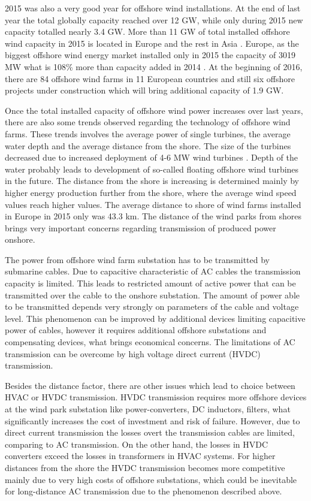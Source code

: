 \documentclass[12pt]{report} %
\begin{document}
2015 was also a very good year for offshore wind installations. At the end of last year the total globally capacity reached over 12 GW, while only during 2015 new capacity totalled nearly 3.4 GW. More than 11 GW of total installed offshore wind capacity in 2015 is located in Europe and the rest in Asia \cite{gwec2015}. Europe, as the biggest offshore wind energy market installed only in 2015 the capacity of 3019 MW what is 108\% more than capacity added in 2014 \cite{ewea2016}. At the beginning of 2016, there are 84 offshore wind farms in 11 European countries and still six offshore projects under construction which will bring additional capacity of 1.9 GW.

Once the total installed capacity of offshore wind power increases over last years, there are also some trends observed regarding the technology of offshore wind farms. These trends involves the average power of single turbines, the average water depth and the average distance from the shore. The size of the turbines decreased due to increased deployment of 4-6 MW wind turbines \cite{ewea2016}. Depth of the water probably leads to development of so-called floating offshore wind turbines in the future. The distance from the shore is increasing is determined mainly by higher energy production further from the shore, where the average wind speed values reach higher values. The average distance to shore of wind farms installed in Europe in 2015 only was 43.3 km. The distance of the wind parks from shores brings very important concerns regarding transmission of produced power onshore.

The power from offshore wind farm substation has to be transmitted by submarine cables. Due to capacitive characteristic of AC cables the transmission capacity is limited. This leads to restricted amount of active power that can be transmitted over the cable to the onshore substation. The amount of power able to be transmitted depends very strongly on parameters of the cable and voltage level. This phenomenon can be improved by additional devices limiting capacitive power of cables, however it requires additional offshore substations and compensating devices, what brings economical concerns. The limitations of AC transmission can be overcome by high voltage direct current (HVDC) transmission.

Besides the distance factor, there are other issues which lead to choice between HVAC or HVDC transmission. HVDC transmission requires more offshore devices at the wind park substation like power-converters, DC inductors, filters, what significantly increases the cost of investment and risk of failure. However, due to direct current transmission the losses overt the transmission cables are limited, comparing to AC transmission. On the other hand, the losses in HVDC converters exceed the losses in transformers in HVAC systems. For higher distances from the shore the HVDC transmission becomes more competitive mainly due to very high costs of offshore substations, which could be inevitable for long-distance AC transmission due to the phenomenon described above.
\end{document}
